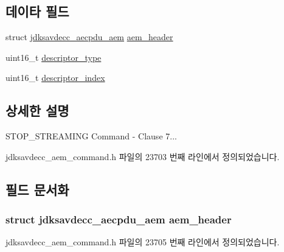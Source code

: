 \subsection*{데이타 필드}
\begin{DoxyCompactItemize}
\item 
struct \hyperlink{structjdksavdecc__aecpdu__aem}{jdksavdecc\+\_\+aecpdu\+\_\+aem} \hyperlink{structjdksavdecc__aem__command__stop__streaming_ae1e77ccb75ff5021ad923221eab38294}{aem\+\_\+header}
\item 
uint16\+\_\+t \hyperlink{structjdksavdecc__aem__command__stop__streaming_ab7c32b6c7131c13d4ea3b7ee2f09b78d}{descriptor\+\_\+type}
\item 
uint16\+\_\+t \hyperlink{structjdksavdecc__aem__command__stop__streaming_a042bbc76d835b82d27c1932431ee38d4}{descriptor\+\_\+index}
\end{DoxyCompactItemize}


\subsection{상세한 설명}
S\+T\+O\+P\+\_\+\+S\+T\+R\+E\+A\+M\+I\+NG Command -\/ Clause 7... 

jdksavdecc\+\_\+aem\+\_\+command.\+h 파일의 23703 번째 라인에서 정의되었습니다.



\subsection{필드 문서화}
\subsubsection[{\texorpdfstring{aem\+\_\+header}{aem_header}}]{\setlength{\rightskip}{0pt plus 5cm}struct {\bf jdksavdecc\+\_\+aecpdu\+\_\+aem} aem\+\_\+header}\hypertarget{structjdksavdecc__aem__command__stop__streaming_ae1e77ccb75ff5021ad923221eab38294}{}\label{structjdksavdecc__aem__command__stop__streaming_ae1e77ccb75ff5021ad923221eab38294}


jdksavdecc\+\_\+aem\+\_\+command.\+h 파일의 23705 번째 라인에서 정의되었습니다.

